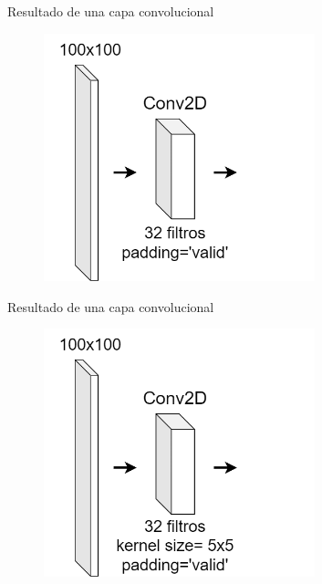 \begin{frame}{Resultado de una capa convolucional}
\begin{figure}
    \centering
    \includegraphics[width=0.7\textwidth]{Slides/figures/Tema 3/ConvDimensions_3.png}
\end{figure}
\end{frame}

\begin{frame}{Resultado de una capa convolucional}
\begin{figure}
    \centering
    \includegraphics[width=0.7\textwidth]{Slides/figures/Tema 3/ConvDimensions_4.png}
\end{figure}
\end{frame}

